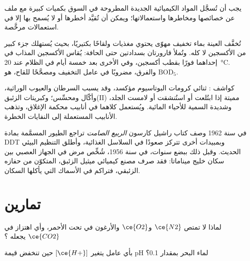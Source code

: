 يجب أن تُسجَّل المواد الكيميائية الجديدة المطروحة في السوق بكميات كبيرة مع
ملف عن خصائصها ومخاطرها واستعمالاتها؛ ويمكن أن تُقيَّد أخطرها
أو لا يُسمح بها إلا في استعمالات مرخَّصة.

\begin{inthelab}
تُخفَّف العينة بماء تخفيف مهوّى يحتوي مغذيات 
ولقاحًا بكتيريًا، بحيث يُستهلك جزء كبير من الأكسجين لا كله. وتُملأ
قارورتان بسدادتين حتى الحافة: يُقاس الأكسجين المذاب في إحداهما
فورًا بقطب أكسجين، وفي الأخرى بعد خمسة أيام في الظلام عند
\qty{20}{\celsius}. والفرق، مضروبًا في عامل التخفيف ومصحَّحًا للقاح، هو
$\mathrm{BOD_5}$.
\end{inthelab}

\begin{safety}{}
كواشف : ثنائي كرومات البوتاسيوم مؤكسد، وقد يسبب السرطان 
والعيوب الوراثية، وأكّال ومحسِّس؛ وكبريتات الزئبق(II) مميتة إذا
ابتُلعت أو استُنشقت أو لامست الجلد، وشديدة السمية للأحياء المائية. ويُستعمل كلاهما
في أنابيب محكمة الإغلاق، وتذهب الأنابيب المستعملة إلى النفايات الخطرة.
\end{safety}

\begin{history}
في سنة 1962 وصف كتاب راشيل كارسون \textit{الربيع الصامت} تراجع الطيور المسمَّمة
بمادة DDT وبمبيدات أخرى تتركز صعودًا في السلاسل الغذائية، وأطلق التنظيم
البيئي الحديث. وقبل ذلك ببضع سنوات، في سنة 1956، شُخِّص مرض في الجهاز
العصبي بين سكان خليج ميناماتا: فقد صرف مصنع كيميائي
ميثيل الزئبق، المتكوّن من حفازه الزئبقي، فتراكم
في الأسماك التي يأكلها السكان.
\end{history}

\section{تمارين}

\begin{exercise}[$\star$]\label{exo:b3:environmental-toxicology:1}
لماذا لا تمتص $\ce{N2}$ و$\ce{O2}$ والأرغون في تحت الأحمر، وأي اهتزاز في $\ce{CO2}$ يجعله
؟
\end{exercise}

\begin{exercise}[$\star$]\label{exo:b3:environmental-toxicology:2}
بأي عامل يتغير $[\ce{H+}]$ حين تنخفض قيمة pH لماء البحر بمقدار 0.1؟
\end{exercise}

